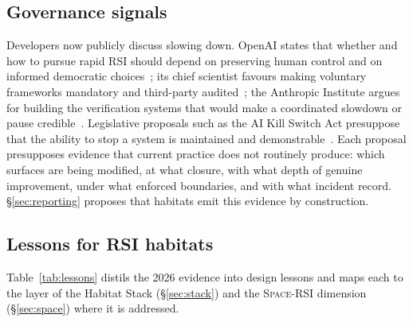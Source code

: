 \documentclass[11pt,a4paper]{article}
\newcommand{\SpaceRSI}{\textsc{Space-RSI}}
\begin{document}
\subsection{Governance signals}

Developers now publicly discuss slowing down. OpenAI states that whether and how to pursue rapid RSI should depend on preserving human control and on informed democratic choices~\cite{openai-accel}; its chief scientist favours making voluntary frameworks mandatory and third-party audited~\cite{pachocki}; the Anthropic Institute argues for building the verification systems that would make a coordinated slowdown or pause credible~\cite{anthropic-rsi}. Legislative proposals such as the AI Kill Switch Act presuppose that the ability to stop a system is maintained and demonstrable~\cite{killswitch}. Each proposal presupposes evidence that current practice does not routinely produce: which surfaces are being modified, at what closure, with what depth of genuine improvement, under what enforced boundaries, and with what incident record. \S\ref{sec:reporting} proposes that habitats emit this evidence by construction.

\subsection{Lessons for RSI habitats}

Table~\ref{tab:lessons} distils the 2026 evidence into design lessons and maps each to the layer of the Habitat Stack (\S\ref{sec:stack}) and the \SpaceRSI{} dimension (\S\ref{sec:space}) where it is addressed.
\end{document}
